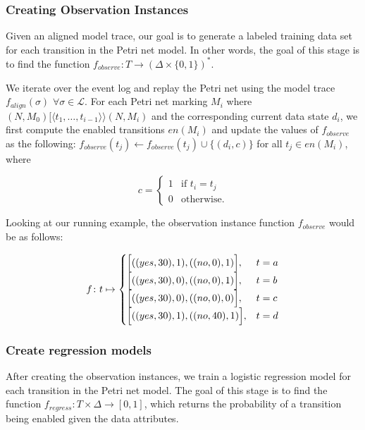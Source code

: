 \subsubsection*{Creating Observation Instances}

Given an aligned model trace, our goal is to generate a labeled training data set for each transition in the Petri net model. In other words, the goal of this stage is to find the function $f_{observe} \colon T \rightarrow (\Delta \times \{0, 1\})^*$.

We iterate over the event log and replay the Petri net using the model trace $f_{align}(\sigma)$ $\forall \sigma \in \mathcal{L}$. For each Petri net marking $M_i$ where $(N, M_0)[\langle t_1, \dots, t_{i-1} \rangle \rangle (N, M_i)$ and the corresponding current data state $d_i$, we first compute the enabled transitions $en(M_i)$ and update the values of $f_{observe}$ as the following:
$f_{observe}(t_j) \leftarrow f_{observe}(t_j) \cup \{ (d_i, c)\}$ for all $t_j \in en(M_i)$, where

\[
    c =
    \begin{cases}
        1 & \text{if } t_i = t_j\\
        0 & \text{otherwise.}
    \end{cases}
\]

Looking at our running example, the observation instance function $f_{observe}$ would be as follows:

\[
    f \colon t \mapsto
    \begin{cases}
        \Bigl[((yes, 30), 1), ((no, 0), 1) \Bigr], & t = a\\
        \Bigl[((yes, 30), 0), ((no, 0), 1)\Bigr], & t = b\\
        \Bigl[((yes, 30), 0), ((no, 0), 0)\Bigr], & t = c\\
        \Bigl[ ((yes, 30), 1), ((no, 40), 1)\Bigr], & t = d\\
    \end{cases}
\]

\subsubsection*{Create regression models}

After creating the observation instances, we train a logistic regression model for each transition in the Petri net model. The goal of this stage is to find the function $f_{regress} \colon T \times \Delta \rightarrow [0 , 1]$, which returns the probability of a transition being enabled given the data attributes.


